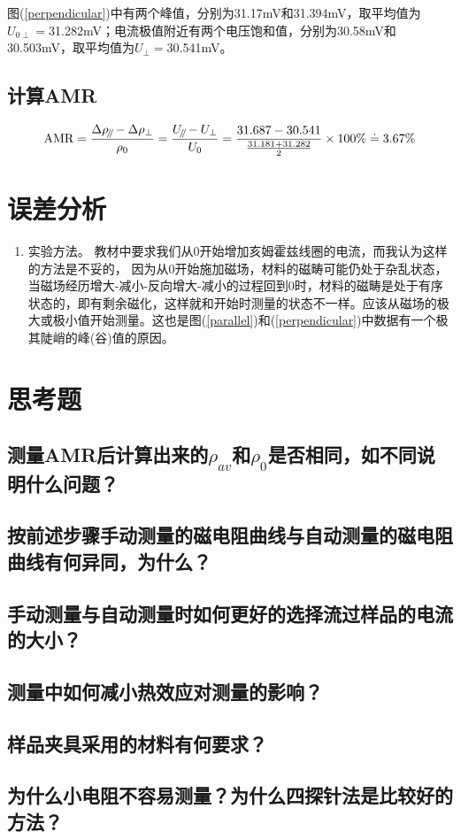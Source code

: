\documentclass[a4paper]{article}
\newcommand{\parallelsum}{\mathbin{\!/\mkern-5mu/\!}}
\begin{document}
图(\ref{perpendicular})中有两个峰值，分别为31.17mV和31.394mV，取平均值为$U_{0\perp}=$31.282mV；电流极值附近有两个电压饱和值，分别为30.58mV和30.503mV，取平均值为$U_{\perp}=$30.541mV。

\newpage
\subsection{计算AMR}
\begin{equation}
\text{AMR} = \frac{\Delta\rho_{\parallelsum} - \Delta\rho_{\perp}}{\rho_{0}} = \frac{U_{\parallelsum} - U_{\perp}}{U_{0}} = \frac{31.687 - 30.541}{\frac{31.181+31.282}{2}}\times 100\% \doteq 3.67\%\label{AMR}
\end{equation}

\section{误差分析}
\begin{enumerate}
	\item 实验方法。
	教材中要求我们从0开始增加亥姆霍兹线圈的电流，而我认为这样的方法是不妥的，%
	因为从0开始施加磁场，材料的磁畴可能仍处于杂乱状态，当磁场经历增大-减小-反向增大-减小的过程回到0时，材料的磁畴是处于有序状态的，即有剩余磁化，这样就和开始时测量的状态不一样。应该从磁场的极大或极小值开始测量。这也是图(\ref{parallel})和(\ref{perpendicular})中数据有一个极其陡峭的峰(谷)值的原因。

\end{enumerate}

\section{思考题}
\subsection*{测量AMR后计算出来的$\rho_{av}$和$\rho_0$是否相同，如不同说明什么问题？}
\subsection*{按前述步骤手动测量的磁电阻曲线与自动测量的磁电阻曲线有何异同，为什么？}
\subsection*{手动测量与自动测量时如何更好的选择流过样品的电流的大小？}
\subsection*{测量中如何减小热效应对测量的影响？}
\subsection*{样品夹具采用的材料有何要求？}

\subsection*{为什么小电阻不容易测量？为什么四探针法是比较好的方法？}


\nocite{jiaocai}

\end{document}
